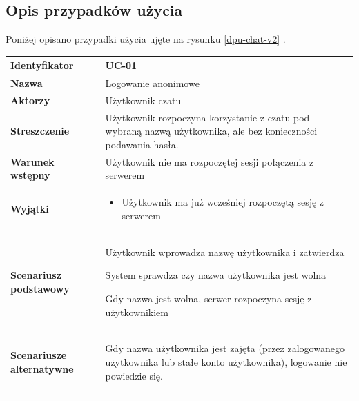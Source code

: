 \subsection{Opis przypadków użycia}

Poniżej opisano przypadki użycia ujęte na rysunku \ref{dpu-chat-v2}
.

{\footnotesize

\vspace{2em}

\begin{tabularx}{\textwidth}{|l|X|}
	\hline
		\textbf{Identyfikator} &
		UC-01
		\\

	\hline
		\textbf{Nazwa} &
		Logowanie anonimowe
		\\

	\hline
		\textbf{Aktorzy} &
			Użytkownik czatu
		\\

	\hline
		\textbf{Streszczenie} &
			Użytkownik rozpoczyna korzystanie z czatu pod wybraną nazwą
			użytkownika, ale bez konieczności podawania hasła.
		\\

	\hline
		\textbf{Warunek wstępny} &
			Użytkownik nie ma rozpoczętej sesji połączenia z serwerem
		\\

	\hline
		\textbf{Wyjątki} &
			\begin{itemize}
				\item Użytkownik ma już wcześniej rozpoczętą sesję z serwerem
			\end{itemize}
		\\

	\hline
		\textbf{Scenariusz podstawowy} &
			\begin{enumreq}
				\item Użytkownik wprowadza nazwę użytkownika i zatwierdza
				\item System sprawdza czy nazwa użytkownika jest wolna
				\item Gdy nazwa jest wolna, serwer rozpoczyna sesję	z użytkownikiem
			\end{enumreq}
		\\

	\hline
		\textbf{Scenariusze alternatywne} &
			\begin{enumreq}
				\item Gdy nazwa użytkownika jest zajęta (przez zalogowanego
				użytkownika lub stałe konto użytkownika), logowanie nie
				powiedzie się.
			\end{enumreq}
		\\


\end{tabularx}}
